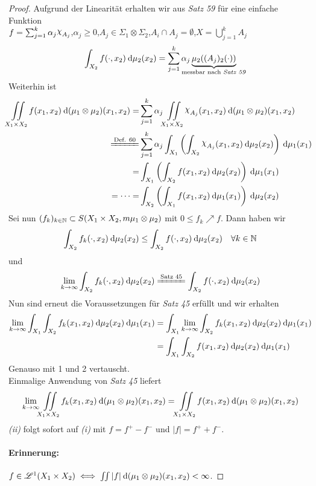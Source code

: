 \documentclass[skript.tex]{subfiles}
\begin{document}
	\begin{proof}
		Aufgrund der Linearität erhalten wir aus \emph{Satz 59} für  eine einfache Funktion \\
		$f = \sum_{j=1}^k \alpha_j\rchi_{A_j}$,\quad $\alpha_j \geq 0$,\quad $A_j \in \Sigma_1 \otimes \Sigma_2$,\quad $A_i \cap A_j = \emptyset$,\quad $X = \bigcup_{j=1}^k A_j$
		\[
			\int_{X_2} f(\cdot,x_2) \md \mu_2(x_2) 
			= \sum_{j=1}^k \alpha_j \underbrace{\mu_2((A_j)_2(\cdot))}_{
				\mathclap{\text{messbar nach \emph{Satz 59}}}
			}
		\]
		Weiterhin ist
		\begin{align*}
			\iint\limits_{X_1 \times X_2} f(x_1,x_2) \md(\mu_1\otimes\mu_2)(x_1,x_2)
			=& \sum_{j=1}^k \alpha_j \iint\limits_{X_1 \times X_2} \rchi_{A_j}(x_1,x_2) \md(\mu_1\otimes\mu_2)(x_1,x_2) \\
			\xlongequal{\text{Def. 60}}& \sum_{j=1}^k 
			\alpha_j \int_{X_1} \left(\int_{X_2} \rchi_{A_j}(x_1,x_2) \md\mu_2(x_2) \right)\md\mu_1(x_1) \\
			=& \int_{X_1} \left(\int_{X_2} f(x_1,x_2) \md\mu_2(x_2) \right)\md\mu_1(x_1) \\
			= \dotsb =&  \int_{X_2} \left(\int_{X_1} f(x_1,x_2) \md\mu_1(x_1) \right)\md\mu_2(x_2)
		\end{align*}
		Sei nun $(f_k)_{k\in\mathbb{N}} \subset S(X_1 \times X_2,m \mu_1 \otimes \mu_2)$ mit $0 \leq f_k \nearrow f$. Dann haben wir
		\[
			\int_{X_2} f_k(\cdot,x_2) \: \mathrm{d}\mu_2(x_2) \leq \int_{X_2} f(\cdot,x_2) \: \mathrm{d}\mu_2(x_2) \quad \forall k \in \mathbb{N}
		\]
		und
		\[
			\lim_{k\to\infty} \int_{X_2} f_k(\cdot,x_2) \md\mu_2(x_2) \xlongequal{\text{Satz 45}} \int_{X_2} f(\cdot,x_2) \md\mu_2(x_2)
		\]
		Nun sind erneut die Voraussetzungen für \emph{Satz 45} erfüllt und wir erhalten
		\begin{align*}
			\lim_{k \to \infty} \int_{X_1} \int_{X_2} f_k(x_1,x_2) \: \mathrm{d}\mu_2(x_2) \: \mathrm{d}\mu_1(x_1)
			&= \int_{X_1} \lim_{k \to \infty} \int_{X_2} f_k(x_1,x_2) \: \mathrm{d}\mu_2(x_2) \: \mathrm{d}\mu_1(x_1) \\
			&= \int_{X_1} \int_{X_2} f(x_1,x_2) \: \mathrm{d}\mu_2(x_2) \: \mathrm{d}\mu_1(x_1)
		\end{align*}
		Genauso mit 1 und 2 vertauscht.\\
		Einmalige Anwendung von \emph{Satz 45} liefert
		\[
			\lim_{k\to\infty} \iint\limits_{X_1 \times X_2} f_k(x_1,x_2) \: \mathrm{d}(\mu_1\otimes\mu_2)(x_1,x_2)
			= \iint\limits_{X_1 \times X_2} f(x_1,x_2) \: \mathrm{d}(\mu_1\otimes\mu_2)(x_1,x_2)
		\]
		\emph{(ii)} folgt sofort auf \emph{(i)} mit $f=f^+ - f^-$ und $|f| = f^+ + f^-$.
		\paragraph{Erinnerung: } $f\in\mathscr{L}^1(X_1 \times X_2) \iff \iint |f| \: \mathrm{d}(\mu_1\otimes\mu_2)(x_1,x_2) < \infty$.
	\end{proof}
	
\end{document}
